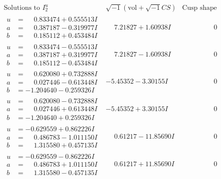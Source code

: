 \documentclass[1p]{elsarticle_modified}
\theoremstyle{definition}
\newcommand{\I}{\sqrt{-1}}
\begin{document}
$$\begin{array}{c|c|c}  
\text{Solutions to }I^u_{2}& \I (\text{vol} + \sqrt{-1}CS) & \text{Cusp shape}\\
 \hline 
\begin{aligned}
u &= \phantom{-}0.833474 + 0.555513 I \\
a &= \phantom{-}0.387187 - 0.319977 I \\
b &= \phantom{-}0.185112 + 0.453484 I\end{aligned}
 & \phantom{-}7.21827 + 1.60938 I & \phantom{-0.000000 } 0 \\ \hline\begin{aligned}
u &= \phantom{-}0.833474 - 0.555513 I \\
a &= \phantom{-}0.387187 + 0.319977 I \\
b &= \phantom{-}0.185112 - 0.453484 I\end{aligned}
 & \phantom{-}7.21827 - 1.60938 I & \phantom{-0.000000 } 0 \\ \hline\begin{aligned}
u &= \phantom{-}0.620080 + 0.732888 I \\
a &= \phantom{-}0.027446 - 0.613448 I \\
b &= -1.204640 - 0.259326 I\end{aligned}
 & -5.45352 - 3.30155 I & \phantom{-0.000000 } 0 \\ \hline\begin{aligned}
u &= \phantom{-}0.620080 - 0.732888 I \\
a &= \phantom{-}0.027446 + 0.613448 I \\
b &= -1.204640 + 0.259326 I\end{aligned}
 & -5.45352 + 3.30155 I & \phantom{-0.000000 } 0 \\ \hline\begin{aligned}
u &= -0.629559 + 0.862226 I \\
a &= \phantom{-}0.486783 - 1.011150 I \\
b &= \phantom{-}1.315580 + 0.457135 I\end{aligned}
 & \phantom{-}0.61217 - 11.85690 I & \phantom{-0.000000 } 0 \\ \hline\begin{aligned}
u &= -0.629559 - 0.862226 I \\
a &= \phantom{-}0.486783 + 1.011150 I \\
b &= \phantom{-}1.315580 - 0.457135 I\end{aligned}
 & \phantom{-}0.61217 + 11.85690 I & \phantom{-0.000000 } 0 \\ \hline\begin{aligned}

\end{aligned}
\end{array}$$
\end{document}
